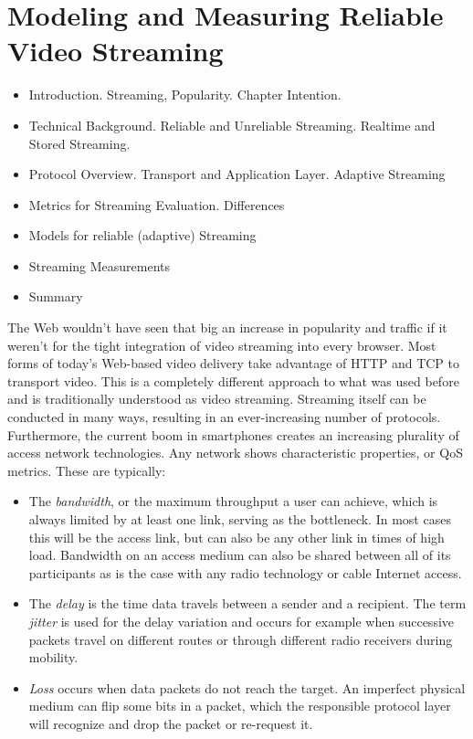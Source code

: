 \chapter{Modeling and Measuring Reliable Video Streaming}
\label{chap:streaming}

\begin{itemize}
\item Introduction. Streaming, Popularity. Chapter Intention.
\item Technical Background. Reliable and Unreliable Streaming. Realtime and Stored Streaming.
\item Protocol Overview. Transport and Application Layer. Adaptive Streaming
\item Metrics for Streaming Evaluation. Differences 
\item Models for reliable (adaptive) Streaming
\item Streaming Measurements
\item Summary
\end{itemize}

The Web wouldn't have seen that big an increase in popularity and traffic if it weren't for the tight integration of video streaming into every browser. Most forms of today's Web-based video delivery take advantage of \gls{HTTP} and \gls{TCP} to transport video. This is a completely different approach to what was used before and is traditionally understood as video streaming. 
Streaming itself can be conducted in many ways, resulting in an ever-increasing number of protocols. Furthermore, the current boom in smartphones creates an increasing plurality of access network technologies.
Any network shows characteristic properties, or \gls{QoS} metrics. These are typically:
\begin{itemize}
\item The \textit{bandwidth}, or the maximum throughput a user can achieve, which is always limited by at least one link, serving as the bottleneck. In most cases this will be the access link, but can also be any other link in times of high load. Bandwidth on an access medium can also be shared between all of its participants as is the case with any radio technology or cable Internet access.
\item The \textit{delay} is the time data travels between a sender and a recipient. The term \textit{jitter} is used  for the delay variation and occurs for example when successive packets travel on different routes or through different radio receivers during mobility.
\item \textit{Loss} occurs when data packets do not reach the target. An imperfect physical medium can flip some bits in a packet, which the responsible protocol layer will recognize and drop the packet or re-request it.
\end{itemize}

